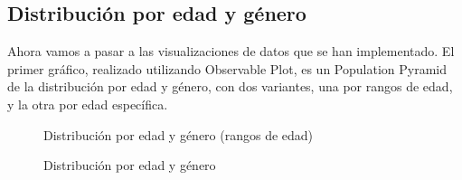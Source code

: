\subsection{Distribución por edad y género}
Ahora vamos a pasar a las visualizaciones de datos que se han implementado. El primer gráfico, realizado utilizando Observable Plot, es un Population Pyramid \cite{populationPyramid} de la distribución por edad y género, con dos variantes, una por rangos de edad, y la otra por edad específica.
\begin{figure}[H]
  \centering
  \caption{Distribución por edad y género (rangos de edad)}
  \label{fig:chart2}
\end{figure}
\begin{figure}[H]
  \centering
  \caption{Distribución por edad y género}
  \label{fig:chart3}
\end{figure}

